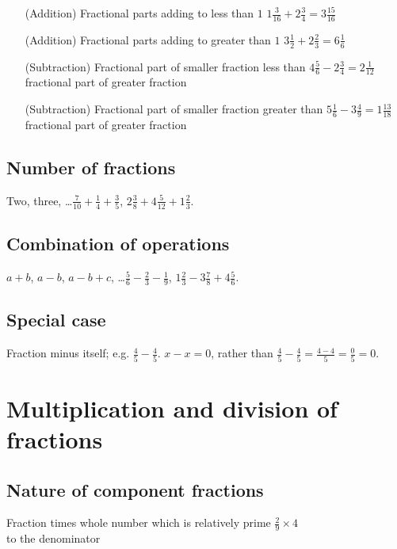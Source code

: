 \documentclass{article}
\begin{document}
\begin{enumerate}
\item[(Addition)] Fractional parts adding to less than \(1\) \hfill \(1\frac{3}{16} + 2\frac{3}{4} = 3\frac{15}{16}\)
\item[(Addition)] Fractional parts adding to greater than \(1\) \hfill \(3\frac{1}{2} + 2\frac{2}{3} = 6\frac{1}{6}\)
\item[(Subtraction)] Fractional part of smaller fraction less than \hfill \(4\frac{5}{6} - 2\frac{3}{4} = 2\frac{1}{12}\)\\
fractional part of greater fraction
\item[(Subtraction)] Fractional part of smaller fraction greater than \hfill \(5\frac{1}{6} - 3\frac{4}{9} = 1\frac{13}{18}\)\\
fractional part of greater fraction
\end{enumerate}

\subsection{Number of fractions}
Two, three, \ldots \hfill \(\frac{7}{10} + \frac{1}{4} + \frac{3}{5}\), \(2\frac{3}{8} + 4\frac{5}{12} + 1\frac{2}{3}\).

\subsection{Combination of operations}
\(a+b\), \(a - b\), \(a-b+c\), \ldots \hfill \(\frac{5}{6} - \frac{2}{3} - \frac{1}{9}\), \(1\frac{2}{3} - 3\frac{7}{8} + 4\frac{5}{6}\).

\subsection{Special case}
Fraction minus itself; e.g. \(\frac{4}{5} - \frac{4}{5}\).  \(x - x = 0\), rather than \(\frac{4}{5} - \frac{4}{5} = \frac{4-4}{5} = \frac{0}{5} = 0\).

\section{Multiplication and division of fractions}

\subsection{Nature of component fractions}

Fraction times whole number which is relatively prime \hfill \(\frac{2}{9} \times 4\) \\
to the denominator
\end{document}

